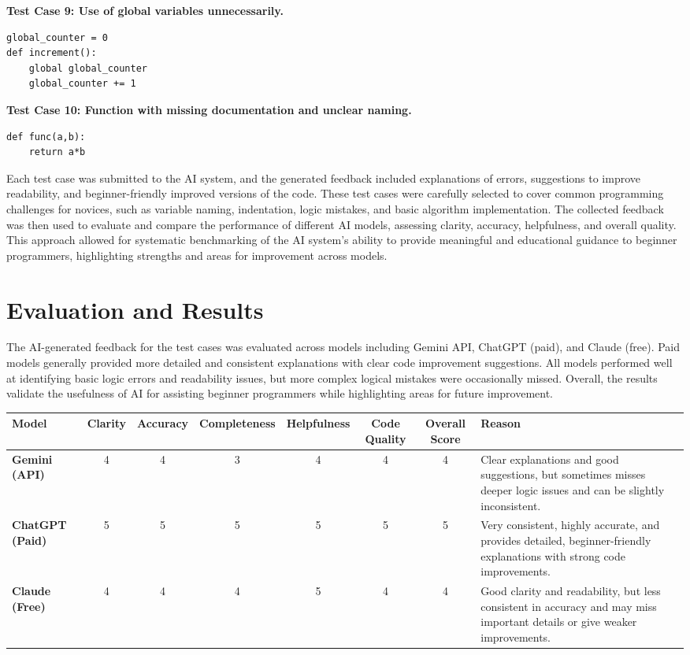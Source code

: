 \documentclass[12pt]{article}
\begin{document}
\textbf{Test Case 9: Use of global variables unnecessarily.}
\begin{lstlisting}
global_counter = 0
def increment():
    global global_counter
    global_counter += 1
\end{lstlisting}

\textbf{Test Case 10: Function with missing documentation and unclear naming.}
\begin{lstlisting}
def func(a,b):
    return a*b
\end{lstlisting}

Each test case was submitted to the AI system, and the generated feedback included explanations of errors, suggestions to improve readability, and beginner-friendly improved versions of the code. These test cases were carefully selected to cover common programming challenges for novices, such as variable naming, indentation, logic mistakes, and basic algorithm implementation. The collected feedback was then used to evaluate and compare the performance of different AI models, assessing clarity, accuracy, helpfulness, and overall quality. This approach allowed for systematic benchmarking of the AI system's ability to provide meaningful and educational guidance to beginner programmers, highlighting strengths and areas for improvement across models.

\section*{Evaluation and Results}

The AI-generated feedback for the test cases was evaluated across models including Gemini API, ChatGPT (paid), and Claude (free). Paid models generally provided more detailed and consistent explanations with clear code improvement suggestions. All models performed well at identifying basic logic errors and readability issues, but more complex logical mistakes were occasionally missed. Overall, the results validate the usefulness of AI for assisting beginner programmers while highlighting areas for future improvement.

\begin{table}[H]
\centering
\scriptsize
\setlength{\tabcolsep}{3.5pt}
\begin{tabularx}{\textwidth}{>{\bfseries}p{1.5cm} c c c c c c X}
\toprule
Model & Clarity & Accuracy & Completeness & Helpfulness & Code Quality & Overall Score & Reason \\
\midrule
Gemini (API) & 4 & 4 & 3 & 4 & 4 & 4 & Clear explanations and good suggestions, but sometimes misses deeper logic issues and can be slightly inconsistent. \\
\midrule
ChatGPT (Paid) & 5 & 5 & 5 & 5 & 5 & 5 & Very consistent, highly accurate, and provides detailed, beginner-friendly explanations with strong code improvements. \\
\midrule
Claude (Free) & 4 & 4 & 4 & 5 & 4 & 4 & Good clarity and readability, but less consistent in accuracy and may miss important details or give weaker improvements. \\
\bottomrule
\end{tabularx}
\end{table}
\end{document}
